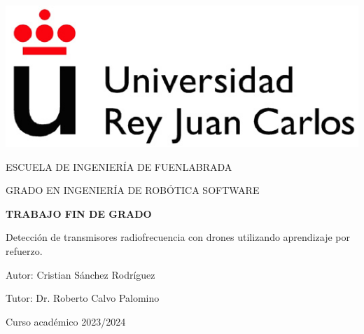 \thispagestyle{empty}

\begin{titlepage}
	\begin{center}
		\vspace*{3mm}
		\begin{center}
			\includegraphics[width=0.4\linewidth]{imagenes/cap1/logo_urjc}
		\end{center}
		\vspace{6.0mm}
		
		\fontsize{15.5}{14}\selectfont ESCUELA DE INGENIERÍA DE FUENLABRADA
		\vspace{13mm}
		
		\fontsize{14}{14}\selectfont GRADO EN INGENIERÍA DE ROBÓTICA SOFTWARE
		
		\vspace{70pt}
		
		\fontsize{15.7}{14}\selectfont \textbf{TRABAJO FIN DE GRADO} 
		
		\vspace{20mm}
		\begin{LARGE}
			Detección de transmisores radiofrecuencia con drones utilizando aprendizaje por refuerzo.
		\end{LARGE}
		
		\vspace{20mm}
		
		\begin{large}
			Autor: Cristian Sánchez Rodríguez
			
			Tutor: Dr. Roberto Calvo Palomino
			
			\vspace{10mm}
		\end{large}
		\begin{normalsize}
			Curso académico 2023/2024		
		\end{normalsize}
		\vspace{10mm}
		
	\end{center}
	
\end{titlepage}

\thispagestyle{empty}
